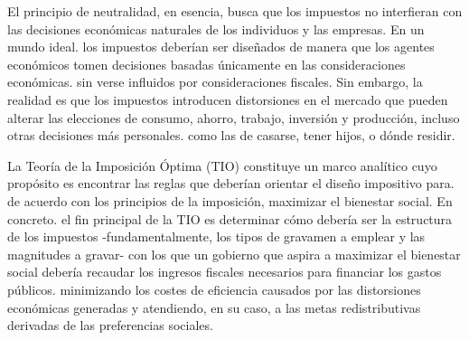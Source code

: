 \documentclass[10pt,a4paper]{article}
\begin{document}
El principio de neutralidad, en esencia, busca que los impuestos no interfieran con las decisiones económicas naturales de los individuos y las empresas. En un mundo ideal. los impuestos deberían ser diseñados de manera que los agentes económicos tomen decisiones basadas únicamente en las consideraciones económicas. sin verse influidos por consideraciones fiscales. Sin embargo, la realidad es que los impuestos introducen distorsiones en el mercado que pueden alterar las elecciones de consumo, ahorro, trabajo, inversión y producción, incluso otras decisiones más personales. como las de casarse, tener hijos, o dónde residir.

La Teoría de la Imposición Óptima (TIO) constituye un marco analítico cuyo propósito es encontrar las reglas que deberían orientar el diseño impositivo para. de acuerdo con los principios de la imposición, maximizar el bienestar social. En concreto. el fin principal de la TIO es determinar cómo debería ser la estructura de los impuestos -fundamentalmente, los tipos de gravamen a emplear y las magnitudes a gravar- con los que un gobierno que aspira a maximizar el bienestar social debería recaudar los ingresos fiscales necesarios para financiar los gastos públicos. minimizando los costes de eficiencia causados por las distorsiones económicas generadas y atendiendo, en su caso, a las metas redistributivas derivadas de las preferencias sociales.
\end{document}
